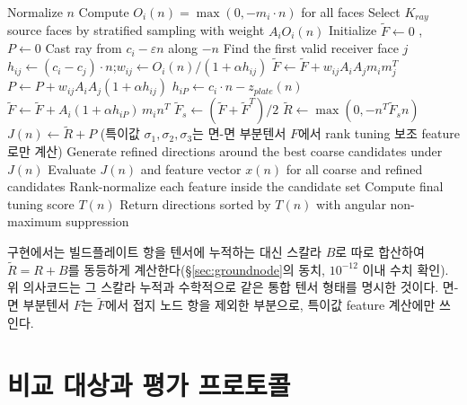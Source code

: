 \documentclass[11pt,a4paper]{article}
\begin{document}
\begin{algorithm}[H]
\caption{Augmented (ground-node) Support Flow Tensor Evaluation with Final Rank Tuning}
\begin{algorithmic}[1]
    \State Normalize $n$
    \State Compute $O_i(n)=\max(0,-m_i\cdot n)$ for all faces
    \State Select $K_{ray}$ source faces by stratified sampling with weight $A_iO_i(n)$
    \State Initialize $\tilde F\gets 0$ , $P\gets 0$
        \State Cast ray from $c_i-\varepsilon n$ along $-n$
        \State Find the first valid receiver face $j$
            \State $h_{ij}\gets(c_i-c_j)\cdot n$;\quad $w_{ij}\gets O_i(n)/(1+\alpha h_{ij})$
            \State $\tilde F\gets \tilde F+w_{ij}A_iA_jm_im_j^T$ 
            \State $P\gets P+w_{ij}A_iA_j(1+\alpha h_{ij})$
        \Else
            \State $h_{iP}\gets c_i\cdot n-z_{plate}(n)$
            \State $\tilde F\gets \tilde F+A_i(1+\alpha h_{iP})\,m_in^T$ 
        \EndIf
    \EndFor
    \State $\tilde F_s\gets(\tilde F+\tilde F^T)/2$
    \State $\tilde R\gets\max(0,-n^T\tilde F_sn)$ 
    \State $J(n)\gets \tilde R+P$
    \State (특이값 $\sigma_1,\sigma_2,\sigma_3$는 면-면 부분텐서 $F$에서 rank tuning 보조 feature로만 계산)
\EndFor
\State Generate refined directions around the best coarse candidates under $J(n)$
\State Evaluate $J(n)$ and feature vector $x(n)$ for all coarse and refined candidates
\State Rank-normalize each feature inside the candidate set
\State Compute final tuning score $T(n)$
\State Return directions sorted by $T(n)$ with angular non-maximum suppression
\end{algorithmic}
\end{algorithm}

구현에서는 빌드플레이트 항을 텐서에 누적하는 대신 스칼라 $B$로 따로 합산하여
$\tilde R=R+B$를 동등하게 계산한다(\S\ref{sec:groundnode}의 동치, $10^{-12}$ 이내 수치 확인).
위 의사코드는 그 스칼라 누적과 수학적으로 같은 통합 텐서 형태를 명시한 것이다.
면-면 부분텐서 $F$는 $\tilde F$에서 접지 노드 항을 제외한 부분으로, 특이값 feature 계산에만 쓰인다.

\section{비교 대상과 평가 프로토콜}
\label{sec:protocol}
\end{document}
